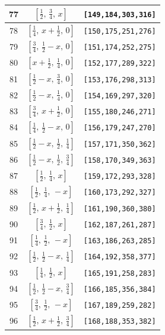 \documentclass[fleqn,8pt]{jsarticle}
\begin{document}
\begin{longtable}{ccc}
77 & $\left[ \frac{1}{2},\, \frac{3}{4},\, x \right]$ & {\tt [149,184,303,316]} \\ \hline
78 & $\left[ \frac{1}{4},\, x + \frac{1}{2},\, 0 \right]$ & {\tt [150,175,251,276]} \\ \hline
79 & $\left[ \frac{3}{4},\, \frac{1}{2} - x,\, 0 \right]$ & {\tt [151,174,252,275]} \\ \hline
80 & $\left[ x + \frac{1}{2},\, \frac{1}{4},\, 0 \right]$ & {\tt [152,177,289,322]} \\ \hline
81 & $\left[ \frac{1}{2} - x,\, \frac{3}{4},\, 0 \right]$ & {\tt [153,176,298,313]} \\ \hline
82 & $\left[ \frac{1}{2} - x,\, \frac{1}{4},\, 0 \right]$ & {\tt [154,169,297,320]} \\ \hline
83 & $\left[ \frac{3}{4},\, x + \frac{1}{2},\, 0 \right]$ & {\tt [155,180,246,271]} \\ \hline
84 & $\left[ \frac{1}{4},\, \frac{1}{2} - x,\, 0 \right]$ & {\tt [156,179,247,270]} \\ \hline
85 & $\left[ \frac{1}{2} - x,\, \frac{1}{2},\, \frac{1}{4} \right]$ & {\tt [157,171,350,362]} \\ \hline
86 & $\left[ \frac{1}{2} - x,\, \frac{1}{2},\, \frac{3}{4} \right]$ & {\tt [158,170,349,363]} \\ \hline
87 & $\left[ \frac{1}{2},\, \frac{1}{4},\, x \right]$ & {\tt [159,172,293,328]} \\ \hline
88 & $\left[ \frac{1}{2},\, \frac{1}{4},\, - x \right]$ & {\tt [160,173,292,327]} \\ \hline
89 & $\left[ \frac{1}{2},\, x + \frac{1}{2},\, \frac{1}{4} \right]$ & {\tt [161,190,360,380]} \\ \hline
90 & $\left[ \frac{3}{4},\, \frac{1}{2},\, x \right]$ & {\tt [162,187,261,287]} \\ \hline
91 & $\left[ \frac{1}{4},\, \frac{1}{2},\, - x \right]$ & {\tt [163,186,263,285]} \\ \hline
92 & $\left[ \frac{1}{2},\, \frac{1}{2} - x,\, \frac{1}{4} \right]$ & {\tt [164,192,358,377]} \\ \hline
93 & $\left[ \frac{1}{4},\, \frac{1}{2},\, x \right]$ & {\tt [165,191,258,283]} \\ \hline
94 & $\left[ \frac{1}{2},\, \frac{1}{2} - x,\, \frac{3}{4} \right]$ & {\tt [166,185,356,384]} \\ \hline
95 & $\left[ \frac{3}{4},\, \frac{1}{2},\, - x \right]$ & {\tt [167,189,259,282]} \\ \hline
96 & $\left[ \frac{1}{2},\, x + \frac{1}{2},\, \frac{3}{4} \right]$ & {\tt [168,188,353,382]} \\
\end{longtable}
\end{document}
